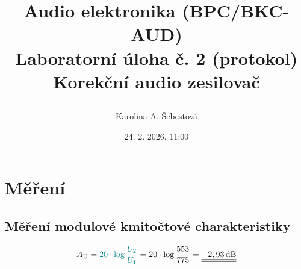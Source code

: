 \documentclass[a4paper, czech]{article}
\title{
    \begin{framed}
        \setstretch{1.5}
        {\large Audio elektronika (BPC/BKC-AUD)}\\
        Laboratorní úloha č. 2 (protokol)\\
        \textbf{Korekční audio zesilovač}
    \end{framed}
    }
\author{Karolína A. Šebestová}
\date{24. 2. 2026, 11:00}
\begin{document}
\maketitle

\section{Měření}

\subsection{Měření modulové kmitočtové charakteristiky}

\begin{equation}
    A_\text{U} = \textcolor{teal}{20 \cdot \log \frac{U_2}{U_1}} = 20 \cdot \log \frac{553}{775} = \underline{\underline{-2,93\,\text{dB}}}
\end{equation}
\end{document}
